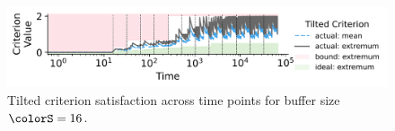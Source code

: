 \begin{figure}
\vspace{0pt}
  \centering
  \includegraphics[width=\linewidth,clip]{binder/teeplots/20/hue=kind+surface-size=16+viz=criterion-satisfaction-lineplot+x=rank+y=tilted-criterion+ext=.pdf}

\vspace{-3ex}
\caption{%
  Tilted criterion satisfaction across time points for buffer size $\colorS=16$.
}
\label{fig:hsurf-tilted-implementation-satisfaction}
\end{figure}
